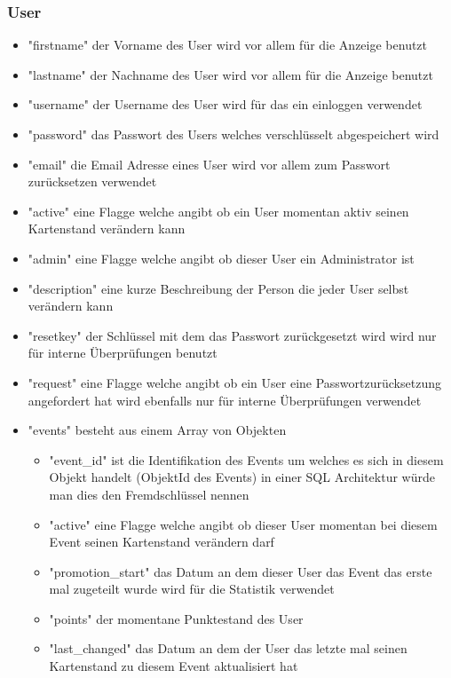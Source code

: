 \documentclass[12pt, letterpaper, twoside]{article}
\begin{document}
			\subsubsection{User}
				\begin{itemize}
					\item "firstname" der Vorname des User wird vor allem für die Anzeige benutzt
					\item "lastname" der Nachname des User wird vor allem für die Anzeige benutzt
					\item "username" der Username des User wird für das ein einloggen verwendet
					\item "password" das Passwort des Users welches verschlüsselt abgespeichert wird
					\item "email" die Email Adresse eines User wird vor allem zum Passwort zurücksetzen verwendet
					\item "active" eine Flagge welche angibt ob ein User momentan aktiv seinen Kartenstand verändern kann
					\item "admin" eine Flagge welche angibt ob dieser User ein Administrator ist
					\item "description" eine kurze Beschreibung der Person die jeder User selbst verändern kann
					\item "resetkey" der Schlüssel mit dem das Passwort zurückgesetzt wird wird nur für interne Überprüfungen benutzt
					\item "request" eine Flagge welche angibt ob ein User eine Passwortzurücksetzung angefordert hat wird ebenfalls nur für interne Überprüfungen verwendet
					\item "events" besteht aus einem Array von Objekten
					\begin{itemize}
						\item "event\_id" ist die Identifikation des Events um welches es sich in diesem Objekt handelt (ObjektId des Events) in einer SQL Architektur würde man dies den Fremdschlüssel nennen
						\item "active" eine Flagge welche angibt ob dieser User momentan bei diesem Event seinen Kartenstand verändern darf
						\item "promotion\_start" das Datum an dem dieser User das Event das erste mal zugeteilt wurde wird für die Statistik verwendet
						\item "points" der momentane Punktestand des User
						\item "last\_changed" das Datum an dem der User das letzte mal seinen Kartenstand zu diesem Event aktualisiert hat

\end{itemize}
\end{itemize}
\end{document}
